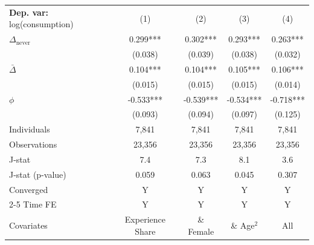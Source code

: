 \begin{tabular}{l cccc} \toprule  \textbf{Dep. var:}  log(consumption) 
                    &\multicolumn{1}{c}{(1)}   &\multicolumn{1}{c}{(2)}   &\multicolumn{1}{c}{(3)}   &\multicolumn{1}{c}{(4)}   \\

\addlinespace
$\Delta_{\text{never}}$&       0.299***&       0.302***&       0.293***&       0.263***\\
                    &     (0.038)   &     (0.039)   &     (0.038)   &     (0.032)   \\

\addlinespace
$\bar{\Delta}$      &       0.104***&       0.104***&       0.105***&       0.106***\\
                    &     (0.015)   &     (0.015)   &     (0.015)   &     (0.014)   \\

\addlinespace
$\phi$              &      -0.533***&      -0.539***&      -0.534***&      -0.718***\\
                    &     (0.093)   &     (0.094)   &     (0.097)   &     (0.125)   \\
\addlinespace
Individuals         &       7,841   &       7,841   &       7,841   &       7,841   \\
Observations        &      23,356   &      23,356   &      23,356   &      23,356   \\
J-stat              &         7.4   &         7.3   &         8.1   &         3.6   \\
J-stat (p-value)    &       0.059   &       0.063   &       0.045   &       0.307   \\
Converged           &           Y   &           Y   &           Y   &           Y   \\
\cmidrule{2-5} Time FE & Y & Y & Y & Y \\ Covariates & Experience Share & \& Female & \& Age$^2$ & All \\ \bottomrule \end{tabular}
